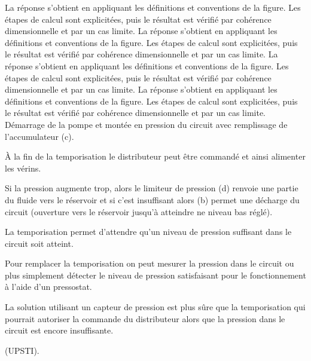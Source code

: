\begin{corrigebox}
La réponse s'obtient en appliquant les définitions et conventions de la
    figure. Les étapes de calcul sont explicitées, puis le résultat est vérifié par
    cohérence dimensionnelle et par un cas limite.
La réponse s'obtient en appliquant les définitions et conventions de la
    figure. Les étapes de calcul sont explicitées, puis le résultat est vérifié par
    cohérence dimensionnelle et par un cas limite.
La réponse s'obtient en appliquant les définitions et conventions de la
    figure. Les étapes de calcul sont explicitées, puis le résultat est vérifié par
    cohérence dimensionnelle et par un cas limite.
La réponse s'obtient en appliquant les définitions et conventions de la
    figure. Les étapes de calcul sont explicitées, puis le résultat est vérifié par
    cohérence dimensionnelle et par un cas limite.
Démarrage de la pompe et montée en pression du circuit avec remplissage de l’accumulateur (c).

À la fin de la temporisation le distributeur peut être commandé et ainsi alimenter les vérins.

Si la pression augmente trop, alors le limiteur de pression (d) renvoie une partie du fluide vers le
réservoir et si c’est insuffisant alors (b) permet une décharge du circuit (ouverture vers le réservoir
jusqu’à atteindre ne niveau bas réglé).

La temporisation permet d’attendre qu’un niveau de pression suffisant dans le circuit soit atteint.

Pour remplacer la temporisation on peut mesurer la pression dans le circuit ou plus simplement détecter
le niveau de pression satisfaisant pour le fonctionnement à l’aide d’un pressostat.

La solution utilisant un capteur de pression est plus sûre que la temporisation qui pourrait autoriser la
commande du distributeur alors que la pression dans le circuit est encore insuffisante.

(UPSTI).
\end{corrigebox}
